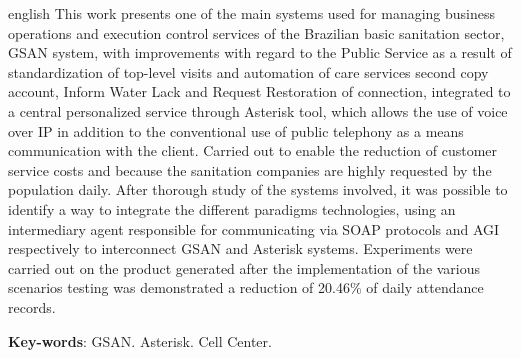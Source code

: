 \begin{resumo}[Abstract]
 \begin{otherlanguage*}{english}
   This work presents one of the main systems used for managing business operations and execution control services of the Brazilian basic sanitation sector, GSAN system, with improvements with regard to the Public Service as a result of standardization of top-level visits and automation of care services second copy account, Inform Water Lack and Request Restoration of connection, integrated to a central personalized service through Asterisk tool, which allows the use of voice over IP in addition to the conventional use of public telephony as a means communication with the client. Carried out to enable the reduction of customer service costs and because the sanitation companies are highly requested by the population daily. After thorough study of the systems involved, it was possible to identify a way to integrate the different paradigms technologies, using an intermediary agent responsible for communicating via SOAP protocols and AGI respectively to interconnect GSAN and Asterisk systems. Experiments were carried out on the product generated after the implementation of the various scenarios testing was demonstrated a reduction of 20.46\% of daily attendance records.

   \vspace{\onelineskip}
 
   \noindent 
   \textbf{Key-words}: GSAN. Asterisk. Cell Center.
 \end{otherlanguage*}
\end{resumo}
